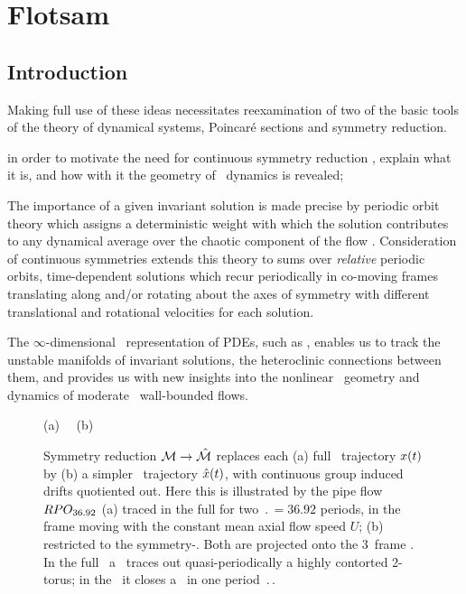 
\section{Flotsam}
\label{s:flotsam}

\subsection{Introduction}
\label{s:introFlot}

Making full use of these ideas necessitates reexamination of two of the
basic tools of the theory of dynamical systems, Poincar\'e sections and
symmetry reduction.

    in order to motivate the need for continuous symmetry reduction , explain
    what it is, and how with it the geometry of \statesp\ dynamics is revealed;


The importance of a given invariant solution is made precise by periodic
orbit theory which assigns a deterministic weight with which the solution
contributes to any dynamical average over the chaotic component of the
flow . Consideration of continuous symmetries extends this
theory to sums over \emph{relative} periodic orbits,
time-dependent solutions which recur periodically in co-moving frames
translating along and/or rotating about the axes of symmetry with
different translational and rotational velocities for each solution.

The $\infty$-dimensional \stateDsp\
representation of PDEs, such as ,
enables us to track the unstable manifolds of invariant
solutions, the heteroclinic connections between them, and
{provides us with} new insights into the nonlinear \statesp\ geometry and
dynamics of moderate \Reynolds\ wall-bounded flows.

%
\begin{figure}
\centering
(a)%
~~(b)%
  \caption{\label{f:MeanVelocityFrame}
Symmetry reduction ${\cal M} \to \hat{\cal M}$ replaces each
(a)
full \statesp\ trajectory $x(t)$ by
(b)
a simpler \reducedsp\ trajectory $\hat{x}(t)$, with continuous group
induced drifts quotiented out. Here this is illustrated by the pipe flow \rpo\
$RPO_{36.92}$
(a) %
traced in the full {\statesp} for two $\period{}=36.92$ periods, in the
frame moving with the constant mean axial flow speed $U$;
(b) %
restricted to the symmetry-\reducedsp. Both are projected onto the
$3$\dmn\ frame . In the full \statesp\ a \rpo\ traces
out quasi-periodically a highly contorted 2-torus; in the \reducedsp\ it
closes a \po\ in one period $\period{}$.
            }
\end{figure}

